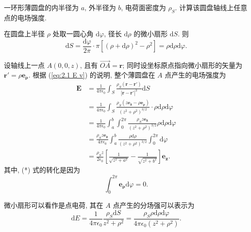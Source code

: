 \begin{exampleprob}[均匀带电环形薄圆盘的场强]
    一环形薄圆盘的内半径为 $a$, 外半径为 $b$, 电荷面密度为 $\rho_S$. 计算该圆盘轴线上任意点的电场强度.

    \begin{solution}[1 直接使用公式]
        在圆盘上半径 $\rho$ 处取一圆心角 $\mathrm{d}\varphi$, 径长 $\mathrm{d}\rho$ 的微小扇形 $\mathrm{d}S$. 则
        \begin{equation*}
            \mathrm{d}S=\frac{\mathrm{d}\varphi}{2\pi}\cdot\pi[(\rho+\mathrm{d}\rho)^2-\rho^2]=\rho\mathrm{d}\rho\mathrm{d}\varphi.
        \end{equation*}

        设轴线上一点 $A(0,0,z)$, 且有 $\overrightarrow{OA}=\bm{r}$; 同时设坐标原点指向微小扇形的矢量为 $\bm{r'}=\rho\bm{e_\rho}$. 根据 (\ref{eq:2.1 E v}) 的说明, 整个薄圆盘在 $A$ 点产生的电场强度为
        \begin{align*}
            \bm{E} & =\frac{1}{4\pi\epsilon_0}\int_S\frac{\rho_S(\bm{r}-\bm{r'})}{|\bm{r}-\bm{r'}|^3}\mathrm{d}S                                               \\
                   & =\frac{1}{4\pi\epsilon_0}\int_S\frac{\rho_S(z\bm{e_z}-\rho\bm{e_\rho})}{(z^2+\rho^2)^{3/2}}\cdot\rho\mathrm{d}\rho\mathrm{d}\varphi       \\
                   & =\frac{1}{4\pi\epsilon_0}\int_{a}^{b}\int_{0}^{2\pi}\frac{\rho_Sz\bm{e_z}}{(z^2+\rho^2)^{3/2}}\rho\mathrm{d}\rho\mathrm{d}\varphi \tag{*} \\
                   & =\frac{\rho_Sz\bm{e_z}}{4\pi\epsilon_0}\int_{a}^{b}\frac{\rho\mathrm{d}\rho}{(z^2+\rho^2)^{3/2}}\int_{0}^{2\pi}\mathrm{d}\varphi          \\
                   & =\frac{\rho_Sz}{2\epsilon_0}\left[\frac{1}{\sqrt{z^2+a^2}}-\frac{1}{\sqrt{z^2+b^2}}\right]\bm{e_z}.
        \end{align*}
        其中, (*) 式的转化是因为
        \begin{equation*}
            \int_{0}^{2\pi}\bm{e_\rho}\mathrm{d}\varphi=0.
        \end{equation*}
    \end{solution}

    \begin{solution}[2 先计算分场强]
        微小扇形可以看作是点电荷, 其在 $A$ 点产生的分场强可以表示为
        \begin{equation*}
            \mathrm{d}E=\frac{1}{4\pi\epsilon_0}\frac{\rho_S\mathrm{d}S}{z^2+\rho^2}=\frac{\rho_S\rho\mathrm{d}\rho\mathrm{d}\varphi}{4\pi\epsilon_0(z^2+\rho^2)}.
        \end{equation*}


\end{solution}
\end{exampleprob}
